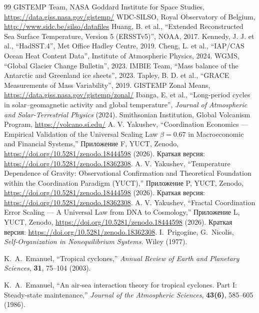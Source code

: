 \documentclass[12pt,a4paper]{article}
\begin{document}
	\begin{thebibliography}{99}
		 GISTEMP Team, NASA Goddard Institute for Space Studies, \url{https://data.giss.nasa.gov/gistemp/}
		 WDC-SILSO, Royal Observatory of Belgium, \url{http://www.sidc.be/silso/datafiles}
		 Huang, B. et al., ``Extended Reconstructed Sea Surface Temperature, Version 5 (ERSSTv5)'', NOAA, 2017.
		 Kennedy, J. J. et al., ``HadSST.4'', Met Office Hadley Centre, 2019.
		 Cheng, L. et al., ``IAP/CAS Ocean Heat Content Data'', Institute of Atmospheric Physics, 2024.
		 WGMS, ``Global Glacier Change Bulletin'', 2023.
		 IMBIE Team, ``Mass balance of the Antarctic and Greenland ice sheets'', 2023.
		 Tapley, B. D. et al., ``GRACE Measurements of Mass Variability'', 2019.
		 GISTEMP Zonal Means, \url{https://data.giss.nasa.gov/gistemp/zonal/}
		 Ibanga, E. et al., ``Long-period cycles in solar–geomagnetic activity and global temperature'', \emph{Journal of Atmospheric and Solar-Terrestrial Physics} (2024).
		 Smithsonian Institution, Global Volcanism Program, \url{https://volcano.si.edu/}
		 A. V. Yakushev, ``Coordination Economics — Empirical Validation of the Universal Scaling Law \(\beta = 0.67\) in Macroeconomic and Financial Systems,'' Приложение F, YUCT, Zenodo, \url{https://doi.org/10.5281/zenodo.18444598} (2026). Краткая версия: \url{https://doi.org/10.5281/zenodo.18362308}.
		 A. V. Yakushev, ``Temperature Dependence of Gravity: Observational Confirmation and Theoretical Foundation within the Coordination Paradigm (YUCT),'' Приложение P, YUCT, Zenodo, \url{https://doi.org/10.5281/zenodo.18444598} (2026). Краткая версия: \url{https://doi.org/10.5281/zenodo.18362308}.
		 A. V. Yakushev, ``Fractal Coordination Error Scaling — A Universal Law from DNA to Cosmology,'' Приложение L, YUCT, Zenodo, \url{https://doi.org/10.5281/zenodo.18444598} (2026). Краткая версия: \url{https://doi.org/10.5281/zenodo.18362308}.
		I.~Prigogine, G.~Nicolis, \emph{Self‑Organization in Nonequilibrium Systems}. Wiley (1977).
		
		K.~A.~Emanuel, ``Tropical cyclones,'' \emph{Annual Review of Earth and Planetary Sciences},
		\textbf{31}, 75--104 (2003).
		
		K.~A.~Emanuel, ``An air‑sea interaction theory for tropical cyclones. Part I:
		Steady‑state maintenance,'' \emph{Journal of the Atmospheric Sciences},
		\textbf{43(6)}, 585--605 (1986).
	\end{thebibliography}
	
\end{document}
